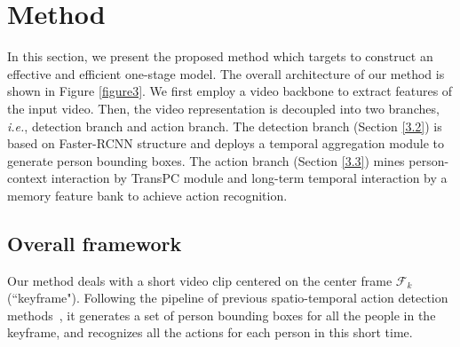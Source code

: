 \documentclass[final]{cvpr}
\newcommand{\iie}{\emph{i.e.}}
\begin{document}
\section{Method}
In this section, we present the proposed method which targets to construct an effective and efficient one-stage model. 
The overall architecture of our method is shown in Figure \ref{figure3}. We first employ a video backbone to extract features of the input video. Then, the video representation is decoupled into two branches, \iie, detection branch and action branch. The detection branch (Section \ref{3.2}) is based on Faster-RCNN structure and deploys a temporal aggregation module to generate person bounding boxes. The action branch (Section \ref{3.3}) mines person-context interaction by TransPC module and long-term temporal interaction by a memory feature bank to achieve action recognition. 

\subsection{Overall framework}
\label{3.1}
Our method deals with a short video clip centered on the center frame $\mathcal{F}_k$ (``keyframe"). Following the pipeline of previous spatio-temporal action detection methods~\cite{Girdhar_2019_CVPR,DBLP:conf/cvpr/GuSRVPLVTRSSM18,DBLP:conf/eccv/SunSVMSS18,DBLP:conf/cvpr/YangY0XDK19,Wu_2019_CVPR,DBLP:conf/eccv/WuKWZW20,DBLP:conf/eccv/TangXMPL20,DBLP:conf/cvpr/PanCSLS021}, it generates a set of person bounding boxes for all the people in the keyframe, and recognizes all the actions for each person in this short time. 
\end{document}
